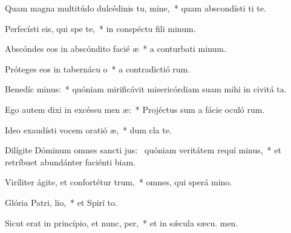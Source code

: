 \item Quam magna multitúdo dulcédinis tu, mine,~* quam abscondísti ti te.
\item Perfecísti eis, qui spe  te,~* in conspéctu fili minum.
\item Abscóndes eos in abscóndito facié æ~* a conturbati minum.
\item Próteges eos in tabernácu o~* a contradictió rum.
\item Benedíc minus:~* quóniam mirificávit misericórdiam suam mihi in civitá ta.
\item Ego autem dixi in excéssu men æ:~* Projéctus sum a fácie oculó rum.
\item Ideo exaudísti vocem oratió æ,~* dum cla  te.
\item Dilígite Dóminum omnes sancti jus:~\pscross{} quóniam veritátem requí minus,~* et retríbuet abundánter faciénti biam.
\item Viríliter ágite, et confortétur  trum,~* omnes, qui sperá  mino.
\item Glória Patri,  lio,~* et Spirí to.
\item Sicut erat in princípio, et nunc,  per,~* et in sǽcula sæcu. men.
